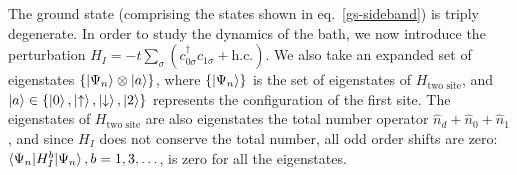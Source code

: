 \documentclass{iopart}
\begin{document}
The ground state (comprising the states shown in eq.~\eqref{gs-sideband}) is triply degenerate. In order to study the dynamics of the bath, we now introduce the perturbation \(H_I = -t\sum_\sigma \left( c^\dagger_{0\sigma}c_{1\sigma} + \text{h.c.}\right) \). We also take an expanded set of eigenstates \(\left\{\ket{\Psi_n}\otimes\ket{a}\right\}\), where \(\left\{\ket{\Psi_n}\right\}\) is the set of eigenstates of \(H_\text{two site}\), and \(\ket{a} \in \left\{ \ket{0}, \ket{\uparrow}, \ket{\downarrow}, \ket{2} \right\} \) represents the configuration of the first site. The eigenstates of \(H_\text{two site}\) are also eigenstates the total number operator \(\hat n_d + \hat n_0 + \hat n_1\), and since \(H_I\) does not conserve the total number, all odd order shifts are zero: \(\braket{\Psi_n | H_I^b | \Psi_n}, b=1,3,\ldots\), is zero for all the eigenstates. 
\end{document}
